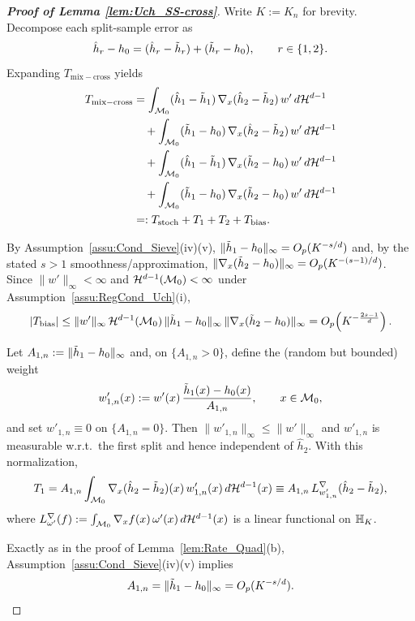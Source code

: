 \documentclass[12pt,american]{article}
\newcommand{\cH}{\mathcal{H}}
\theoremstyle{definition}
\theoremstyle{plain}
\theoremstyle{definition}
\theoremstyle{plain}
\theoremstyle{plain}
\theoremstyle{plain}
\theoremstyle{plain}
\theoremstyle{plain}
\begin{document}
\begin{proof}[\textbf{Proof of Lemma \ref{lem:Uch_SS-cross}}]
Write $K:=K_n$ for brevity.
Decompose each split-sample error as
\[
\hat h_r-h_0=(\hat h_r-\tilde{h}_r)+(\tilde{h}_r-h_0),\qquad r\in\{1,2\}.
\]
Expanding $T_{\mathrm{mix-cross}}$ yields
\begin{align}
T_{\mathrm{mix-cross}}
&=\int_{\cM_0}(\hat h_1-\td h_1)\,\nabla_x(\hat h_2-\td h_2)\,w'\,d\cH^{d-1} \notag\\
&\quad+\int_{\cM_0}(\td h_1-h_0)\,\nabla_x(\hat h_2-\td h_2)\,w'\,d\cH^{d-1} \notag\\
&\quad+\int_{\cM_0}(\hat h_1-\td h_1)\,\nabla_x(\td h_2-h_0)\,w'\,d\cH^{d-1} \notag\\
&\quad+\int_{\cM_0}(\td h_1-h_0)\,\nabla_x(\td h_2-h_0)\,w'\,d\cH^{d-1} \notag\\
&=:T_{\mathrm{stoch}}+T_{1}+T_{2}+T_{\mathrm{bias}}.
\label{eq:Uch_cross_split}
\end{align}

By Assumption~\ref{assu:Cond_Sieve}(iv)(v),
$\|\tilde{h}_1-h_0\|_\infty=O_p(K^{-s/d})$ and, by the stated $s>1$ smoothness/approximation,
$\|\nabla_x(\tilde{h}_2-h_0)\|_\infty=O_p(K^{-(s-1)/d})$.
Since $\|w'\|_\infty<\infty$ and $\cH^{d-1}(\cM_0)<\infty$ under Assumption~\ref{assu:RegCond_Uch}$($i$)$,
\[
|T_{\mathrm{bias}}|
\le \|w'\|_{\infty}\,\cH^{d-1}(\cM_0)\,\|\td h_1-h_0\|_{\infty}\,\|\nabla_x(\td h_2-h_0)\|_{\infty}
=O_p\!\left(K^{-\frac{2s-1}{d}}\right).
\]

\smallskip
Let $A_{1,n}:=\|\tilde{h}_1-h_0\|_\infty$ and, on $\{A_{1,n}>0\}$, define the (random but bounded) weight
\[
w'_{1,n}(x):=w'(x)\,\frac{\tilde{h}_1(x)-h_0(x)}{A_{1,n}},\qquad x\in\mathcal{M}_0,
\]
and set $w'_{1,n}\equiv 0$ on $\{A_{1,n}=0\}$.
Then $\|w'_{1,n}\|_\infty\le \|w'\|_\infty$ and $w'_{1,n}$ is measurable w.r.t.\ the first split and hence independent of $\hat h_2$.
With this normalization,
\begin{equation}\label{eq:T1_normalized}
T_{1}
=A_{1,n}\int_{\cM_0}\nabla_x(\hat h_2-\td h_2)(x)\,w'_{1,n}(x)\,d\cH^{d-1}(x)
\equiv A_{1,n}\,L^{\nabla}_{w'_{1,n}}(\hat h_2-\td h_2),
\end{equation}
where $L^{\nabla}_{\omega'}(f):=\int_{\cM_0}\nabla_x f(x)\,\omega'(x)\,d\cH^{d-1}(x)$ is a linear functional on $\mathbb{H}_K$.

Exactly as in the proof of Lemma~\ref{lem:Rate_Quad}(b),
Assumption~\ref{assu:Cond_Sieve}(iv)(v) implies
\begin{equation}\label{eq:A1n_rate_cross}
A_{1,n}=\|\tilde{h}_1-h_0\|_\infty=O_p(K^{-s/d}).
\end{equation}


\end{proof}
\end{document}
